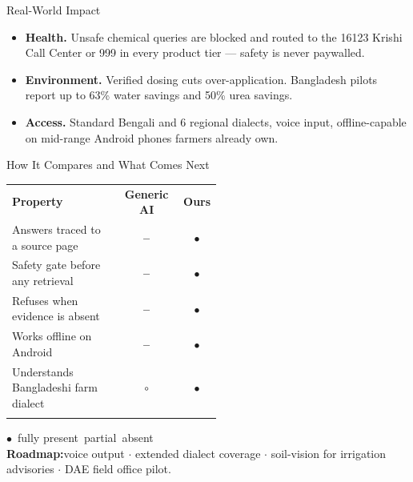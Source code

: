 \documentclass[final]{beamer}
\newlength{\colwidth}\setlength{\colwidth}{0.1796\paperwidth}
\newcommand{\Ndialects}{6}
\newcommand{\Krishi}{16123}
\newcommand{\Emergency}{999}
\newcommand{\WaterSave}{63\%}
\newcommand{\UreaSave}{50\%}
\newcommand{\yes}{{\color{leaf}\bfseries\Large$\bullet$}}
\newcommand{\nomark}{{\color{rulegrey}\bfseries\Large--}}
\newcommand{\partmark}{{\color{ochre}\bfseries\Large$\circ$}}
\begin{document}
\begin{frame}[t]
\begin{columns}[t]
\begin{column}{\colwidth}
  \begin{block}{Real-World Impact}
    {\small
    \begin{itemize}\setlength{\itemsep}{0.2ex}
      \item \textbf{Health.} Unsafe chemical queries are blocked and routed to the
            \Krishi{} Krishi Call Center or \Emergency{} in every product tier — safety
            is never paywalled.
      \item \textbf{Environment.} Verified dosing cuts over-application. Bangladesh pilots
            report up to \WaterSave{} water savings and \UreaSave{} urea savings.
      \item \textbf{Access.} Standard Bengali and \Ndialects{} regional dialects, voice
            input, offline-capable on mid-range Android phones farmers already own.
    \end{itemize}}
  \end{block}

  \begin{exampleblock}{How It Compares and What Comes Next}
    {\small\renewcommand{\arraystretch}{1.38}\setlength{\tabcolsep}{4pt}
    \begin{tabular}{@{}p{0.52\linewidth}cc@{}}
      \toprule
      \addlinespace[0.2ex]
      \textbf{Property} & \textbf{Generic AI} & \textbf{Ours} \\
      \addlinespace[0.2ex]\midrule\addlinespace[0.4ex]
      Answers traced to a source page    & \nomark & \yes \\[0.25ex]
      Safety gate before any retrieval   & \nomark & \yes \\[0.25ex]
      Refuses when evidence is absent    & \nomark & \yes \\[0.25ex]
      Works offline on Android           & \nomark & \yes \\[0.25ex]
      Understands Bangladeshi farm dialect & \partmark & \yes \\[0.25ex]
      \addlinespace[0.1ex]\bottomrule
    \end{tabular}

    \vspace{0.3ex}
    {\footnotesize \yes\ fully present\enspace\partmark\ partial\enspace\nomark\ absent}\\[0.4ex]
    \textbf{Roadmap:}\enspace voice output $\cdot$ extended dialect coverage $\cdot$
    soil-vision for irrigation advisories $\cdot$ DAE field office pilot.}
  \end{exampleblock}


\end{column}
\end{columns}
\end{frame}
\end{document}
